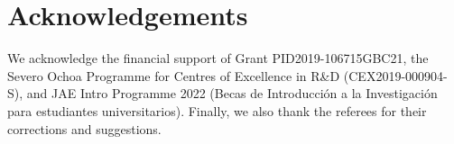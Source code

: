 \documentclass[12pt]{article}
\begin{document}
\section{Acknowledgements}
We acknowledge the financial support of Grant PID2019-106715GBC21, the Severo Ochoa Programme for Centres of Excellence in R\&D (CEX2019-000904-S), and JAE Intro Programme 2022 (Becas de Introducción a la Investigación para estudiantes universitarios). Finally, we also thank the referees for their corrections and suggestions.

{}
\pagestyle{empty}
\end{document}
